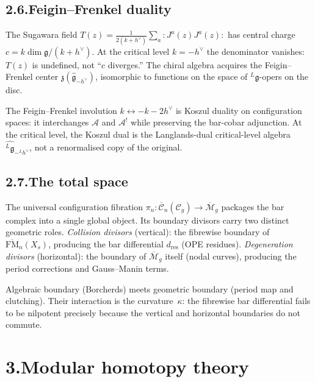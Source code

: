 \documentclass[11pt,reqno]{amsart}
\theoremstyle{definition}
\theoremstyle{remark}
\providecommand{\cA}{\mathcal{A}}
\numberwithin{equation}{section}
\begin{document}
\subsection*{2.6.\enspace Feigin--Frenkel duality}

The Sugawara field
$T(z)=\tfrac{1}{2(k+h^\vee)}\sum_a{:}J^a(z)J^a(z){:}$
has central charge $c=k\dim\mathfrak g/(k+h^\vee)$. At the critical
level $k=-h^\vee$ the denominator vanishes: $T(z)$ is undefined, not
``$c$ diverges.'' The chiral algebra acquires the Feigin--Frenkel
center $\mathfrak z(\widehat{\mathfrak g}_{-h^\vee})$, isomorphic to
functions on the space of ${}^L\mathfrak g$-opers on the disc.

The Feigin--Frenkel involution $k\leftrightarrow-k-2h^\vee$ is Koszul
duality on configuration spaces: it interchanges $\cA$ and $\cA^!$
while preserving the bar-cobar adjunction. At the critical level, the
Koszul dual is the Langlands-dual critical-level
algebra~$\widehat{{}^L\mathfrak g}_{-{}^Lh^\vee}$, not a renormalised
copy of the original.

\subsection*{2.7.\enspace The total space}

The universal configuration fibration
$\pi_n\colon\overline{\mathcal C}_n(\mathcal C_g)\to\overline{\mathcal M}_g$
packages the bar complex into a single global object. Its boundary
divisors carry two distinct geometric roles. \emph{Collision
divisors} (vertical): the fibrewise boundary of
$\overline{\mathrm{FM}}_n(X_s)$, producing the bar differential
$d_{\mathrm{res}}$ (OPE residues). \emph{Degeneration divisors}
(horizontal): the boundary of $\overline{\mathcal M}_g$ itself (nodal
curves), producing the period corrections and Gauss--Manin terms.

Algebraic boundary (Borcherds) meets geometric boundary (period map
and clutching). Their interaction is the curvature~$\kappa$: the
fibrewise bar differential fails to be nilpotent precisely because
the vertical and horizontal boundaries do not commute.


\section*{3.\quad Modular homotopy theory}
\end{document}
